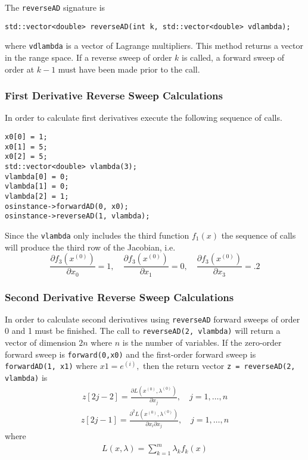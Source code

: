 \documentclass[11pt]{article}
\newcommand{\D}[2]{ \frac{\partial #1}{\partial #2} }
\newcommand{\DD}[3]{ \frac{\partial^2 #1}{\partial #2 \partial #3} }
\renewcommand{\_}{{\char"5F}}
\renewcommand{\{}{{\char"7B}}
\renewcommand{\}}{{\char"7D}}
\renewcommand{\^}{{\char"0D}}
\renewcommand{\'}{{\char"0D}}
\begin{document}
The {\tt reverseAD} signature is
\begin{verbatim}
std::vector<double> reverseAD(int k, std::vector<double> vdlambda);
\end{verbatim}
where {\tt vdlambda} is a vector of Lagrange multipliers.  This method returns a vector in the range space. If a reverse sweep of order $k$ is called, a forward sweep of order at $k -1$ must have been made prior to the call.

\subsubsection{First Derivative Reverse Sweep Calculations}

In order to calculate first derivatives execute the following sequence of calls.
\begin{verbatim}
x0[0] = 1;
x0[1] = 5;
x0[2] = 5;
std::vector<double> vlambda(3);
vlambda[0] = 0;
vlambda[1] = 0;
vlambda[2] = 1;
osinstance->forwardAD(0, x0);
osinstance->reverseAD(1, vlambda);
\end{verbatim}
Since the {\tt vlambda} only includes the third function $f_{1}(x)$ the sequence of calls will produce the third row of the Jacobian, i.e.
$$
\D{f_{3}(x^{(0)})}{x_{0}}  = 1,  \quad \D{f_{3}(x^{(0)})}{x_{1}}  = 0, \quad  \D{f_{3}(x^{(0)})}{x_{3}}  = .2
$$

\subsubsection{Second Derivative Reverse Sweep Calculations}

In order to calculate second derivatives using {\tt reverseAD} forward sweeps of order 0 and 1 must be finished.  The call to {\tt reverseAD(2, vlambda)} will return a vector of dimension $2n$ where $n$ is the number of variables.  If the zero-order forward sweep is {\tt forward(0,x0)} and the first-order forward sweep is {\tt forwardAD(1, x1)} where $x1 = e^{(i)},$ then the return vector {\tt z = reverseAD(2,  vlambda)} is
\begin{eqnarray}
z[2j - 2]  = \D{L (x^{(0)}, \lambda^{(0)})}{x_{j}}, \quad j = 1, \ldots, n
\end{eqnarray}
\begin{eqnarray}
z[2j - 1]  = \DD{L(x^{(0)}, \lambda^{(0)})}{x_{i}}{x_{j}}, \quad j = 1, \ldots, n
\end{eqnarray}
where
\begin{eqnarray}
L (x, \lambda) = \sum_{k = 1}^{m} \lambda_{k} f_{k}(x)
\end{eqnarray}
\end{document}
